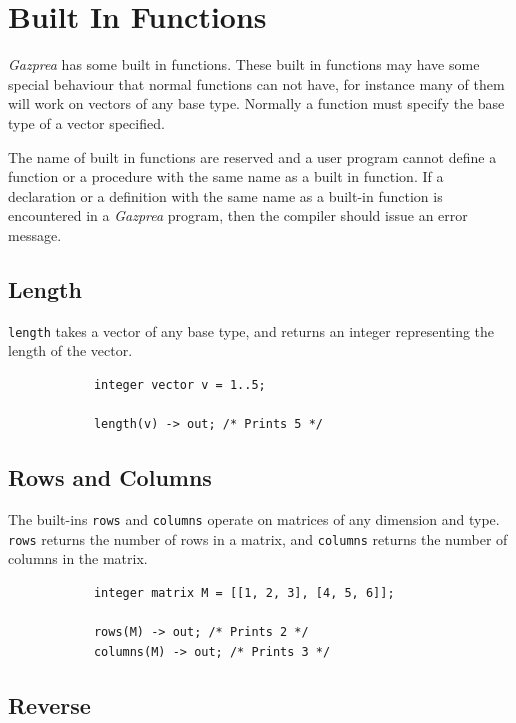 \documentclass{article}
\begin{document}
\section{Built In Functions}\label{sec:builtIn}

	\textit{Gazprea} has some built in functions. These built in functions may have some special behaviour that normal
	functions can not have, for instance many of them will work on vectors of any base type. Normally a function must
	specify the base type of a vector specified.

	The name of built in functions are reserved and a user program cannot define a function or a procedure with the same
	name as a built in function. If a declaration or a definition with the same name as a built-in function is
	encountered in a \textit{Gazprea} program, then the compiler should issue an error message.

	\subsection{Length}\label{sec:length}

		\texttt{length} takes a vector of any base type, and returns an integer representing the length of the vector.

		\begin{lstlisting}
			integer vector v = 1..5;

			length(v) -> out; /* Prints 5 */
		\end{lstlisting}


	\subsection{Rows and Columns}\label{sec:rowsColumns}

		The built-ins \texttt{rows} and \texttt{columns} operate on matrices of any dimension and type. \texttt{rows}
		returns the number of rows in a matrix, and \texttt{columns} returns the number of columns in the matrix.

		\begin{lstlisting}
			integer matrix M = [[1, 2, 3], [4, 5, 6]];

			rows(M) -> out; /* Prints 2 */
			columns(M) -> out; /* Prints 3 */
		\end{lstlisting}


	\subsection{Reverse}\label{sec:reverse}
\end{document}
